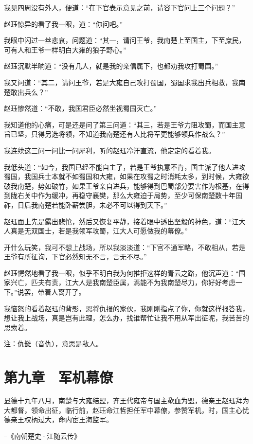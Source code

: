 我见四周没有外人，便道：“在下官表示意见之前，请容下官问上三个问题？”

赵珏惊异的看了我一眼，道：“你问吧。”

我眼中闪过一丝悲哀，问题道：“其一，请问王爷，我南楚上至国主，下至庶民，可有人和王爷一样明白大雍的狼子野心。”

赵珏沉默半晌道：“没有几人，就是我的亲信属下，也都劝我攻打蜀国。”

我又问道：“其二，请问王爷，若是大雍自己攻打蜀国，蜀国求我出兵相救，我南楚敢出兵么？”

赵珏惨然道：“不敢，我国君臣必然坐视蜀国灭亡。”

我知道他的心痛，可是还是问了第三问道：“其三，若是王爷力阻攻蜀，而国主意旨已坚，只得另选将领，不知道我南楚还有人比将军更能够领兵作战么？”

我连续这三问一问比一问犀利，听的赵珏冷汗直流，他定定的看着我。

我低头道：“如今，我国已经不能自主了，若是王爷执意不肯，国主派了他人进攻蜀国，我国兵士本就不如蜀国和大雍，如果在攻蜀之时消耗太多，到时候，大雍欲破我南楚，势如破竹，如果王爷亲自进兵，能够得到巴蜀部分要害作为根基，在得到陇右关中作为缓冲，再稳守襄樊，那么大雍迫于局势，至少可保南楚数十年国祚，日后我南楚若能卧薪尝胆，未必不可以得到天下。”

赵珏面上先是露出悲怆，然后又恢复平静，接着眼中透出坚毅的神色，道：“江大人真是无双国士，若是我领军攻蜀，江大人可愿做我的幕僚。”

开什么玩笑，我可不想上战场，所以我淡淡道：“下官不通军略，不敢相从，若是王爷有所征询，下官必然知无不言，言无不尽。”

赵珏愕然地看了我一眼，似乎不明白我为何推拒这样的青云之路，他沉声道：“国家兴亡，匹夫有责，江大人是我南楚臣属，焉能不为我南楚尽力，你好好考虑一下。”说罢，带着人离开了。

我恼怒的看着赵珏的背影，恩将仇报的家伙，我刚刚指点了你，你就这样报答我，想让我上战场，真是岂有此理，怎么办，找谁帮忙让我不用从军出征呢，我苦苦的思索着。

注：仇雠（音仇），意思是敌人。

\chapter{第九章　军机幕僚}

显德十九年八月，南楚与大雍结盟，齐王代雍帝与国主歃血为盟，德亲王赵珏拜为大都督，领命出征，临行前，赵珏命江哲担任军中幕僚，参赞军机，时，国主心忧德亲王权柄过大，命内宦王海监军。

--《南朝楚史·江随云传》

